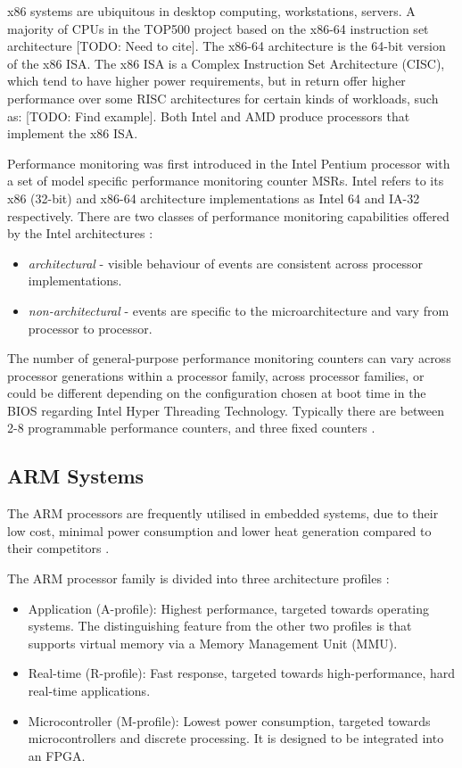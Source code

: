 {x86 systems are ubiquitous in desktop computing, workstations, servers. A majority of CPUs in the TOP500 project based on the x86-64 instruction set architecture [TODO: Need to cite]. The x86-64 architecture is the 64-bit version of the x86 ISA. The x86 ISA is a Complex Instruction Set Architecture (CISC), which tend to have higher power requirements, but in return offer higher performance over some RISC architectures for certain kinds of workloads, such as: [TODO: Find example]. Both Intel and AMD produce processors that implement the x86 ISA.

Performance monitoring was first introduced in the Intel Pentium processor with a set of model specific performance monitoring counter MSRs. Intel refers to its x86 (32-bit) and x86-64 architecture implementations as Intel 64 and IA-32 respectively. There are two classes of performance monitoring capabilities offered by the Intel architectures \cite{DocsIntel64IA32Vol3B}:
\begin{itemize}
    \item \textit{architectural} - visible behaviour of events are consistent across processor implementations.
    \item \textit{non-architectural} - events are specific to the microarchitecture and vary from processor to processor.
\end{itemize}

The number of general-purpose performance monitoring counters can vary across processor generations within a processor family, across processor families, or could be different depending on the configuration chosen at boot time in the BIOS regarding Intel Hyper Threading Technology. Typically there are between 2-8 programmable performance counters, and three fixed counters \cite{} \cite{}.

\subsection{ARM Systems}

The ARM processors are frequently utilised in embedded systems, due to their low cost, minimal power consumption and lower heat generation compared to their competitors \cite{ArticleEmbeddedTwoPercSol}.

The ARM processor family is divided into three architecture profiles \cite{DocsArmArchProfiles}:
\begin{itemize}
    \item Application (A-profile): Highest performance, targeted towards operating systems. The distinguishing feature from the other two profiles is that supports virtual memory via a Memory Management Unit (MMU).
    \item Real-time (R-profile): Fast response, targeted towards high-performance, hard real-time applications.
    \item Microcontroller (M-profile): Lowest power consumption, targeted towards microcontrollers and discrete processing. It is designed to be integrated into an FPGA.
\end{itemize}

}
